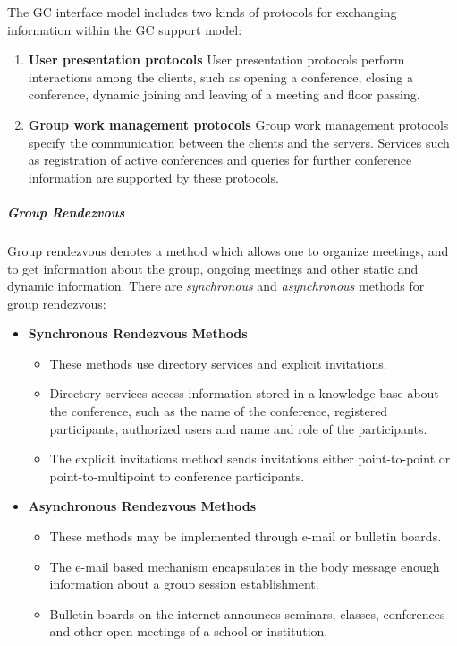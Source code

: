 The GC interface model includes two kinds of protocols for exchanging information within the GC support model:
\begin{enumerate}
	\item \textbf{User presentation protocols}
	User presentation protocols perform interactions among the clients, such as opening a conference, closing a conference, dynamic joining and leaving of a meeting and floor passing.
	
	\item \textbf{Group work management protocols}
	 Group work management protocols specify the communication between the clients and the servers. Services such as registration of active conferences and queries for further conference information are supported by these protocols.
	
\end{enumerate}


\subparagraph{Group Rendezvous}
Group rendezvous denotes a method which allows one to organize meetings, and to get information about the group, ongoing meetings and other static and dynamic information. There are \textit{synchronous} and \textit{asynchronous} methods for group rendezvous:

\begin{itemize}
	\item \textbf{Synchronous Rendezvous Methods}
	\begin{itemize}
		\item These methods use directory services and explicit invitations. 
		\item Directory	services access information stored in a knowledge base about the conference,
		such as the name of the conference, registered participants, authorized users and name and role of the participants.
		\item The explicit invitations method sends invitations either point-to-point or point-to-multipoint to conference participants.
	\end{itemize}

\item \textbf{Asynchronous Rendezvous Methods}
	\begin{itemize}
		\item These methods may be implemented through e-mail or bulletin boards. 
		\item The e-mail based mechanism encapsulates in the body message enough information about a group session establishment.
		\item Bulletin boards on the internet announces seminars, classes, conferences and other open meetings of a school or institution.
	\end{itemize}
\end{itemize}


